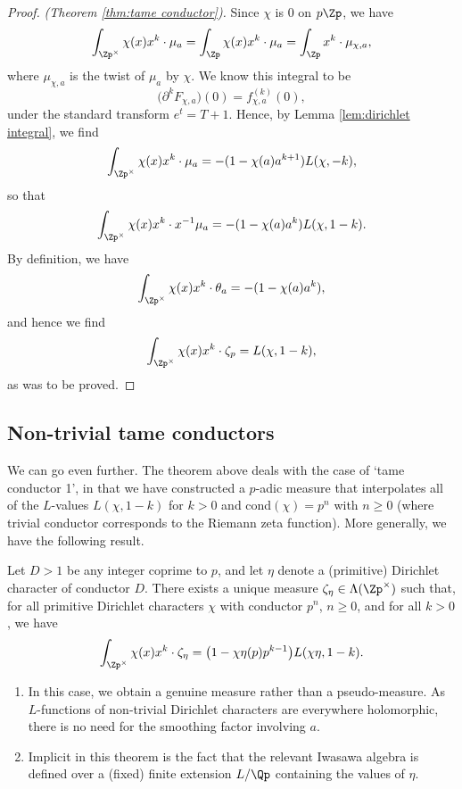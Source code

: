 \documentclass[a4paper,10pt, english, reqno]{smfart}
\numberwithin{equation}{section}
\begin{document}
\begin{proof}\emph{(Theorem \ref{thm:tame conductor}).}
Since $\chi$ is 0 on $p\Zp$, we have
\[ \int_{\Zp^\times}\chi(x)x^k \cdot\mu_a = \int_{\Zp}\chi(x)x^k \cdot\mu_a = \int_{\Zp}x^k \cdot\mu_{\chi,a}, \]
where $\mu_{\chi,a}$ is the twist of $\mu_a$ by $\chi$. We know this integral to be
\[\big( \partial^k F_{\chi,a} \big)(0) = f_{\chi,a}^{(k)}(0),\]
under the standard transform $e^t = T+1$. Hence, by Lemma \ref{lem:dirichlet integral}, we find
\[\int_{\Zp^\times}\chi(x)x^k \cdot\mu_a = -(1-\chi(a)a^{k+1})L(\chi,-k),\]
so that 
\[\int_{\Zp^\times}\chi(x)x^k \cdot x^{-1}\mu_a = -(1-\chi(a)a^{k})L(\chi,1-k).\]
By definition, we have
\[\int_{\Zp^\times}\chi(x)x^k \cdot\theta_a = -(1-\chi(a)a^{k}),\]
and hence we find
\[\int_{\Zp^\times}\chi(x)x^k \cdot\zeta_p = L(\chi,1-k),\]
as was to be proved.
\end{proof}


\subsection{Non-trivial tame conductors}\label{sec:non-trivial tame conductor}

We can go even further. The theorem above deals with the case of `tame conductor 1', in that we have constructed a $p$-adic measure that interpolates all of the $L$-values $L(\chi,1-k)$ for $k > 0$ and cond$(\chi) = p^n$ with $n \geq 0$ (where trivial conductor corresponds to the Riemann zeta function). More generally, we have the following result.

\begin{theorem} \label{thm:nontame}
Let $D > 1$ be any integer coprime to $p$, and let $\eta$ denote a (primitive) Dirichlet character of conductor $D$. There exists a unique measure $\zeta_\eta \in \Lambda(\Zp^\times)$ such that, for all primitive Dirichlet characters $\chi$ with conductor $p^n$, $n \geq 0$, and for all $k > 0$, we have
\[\int_{\Zp^\times} \chi(x) x^k \cdot\zeta_{\eta} = \big(1 - \chi \eta(p) p^{k-1}\big) L(\chi \eta,1-k). \]
\end{theorem}

\begin{remarks} \leavevmode
\begin{enumerate}
\item In this case, we obtain a genuine measure rather than a pseudo-measure. As $L$-functions of non-trivial Dirichlet characters are everywhere holomorphic, there is no need for the smoothing factor involving $a$.
\item Implicit in this theorem is the fact that the relevant Iwasawa algebra is defined over a (fixed) finite extension $L/\Qp$ containing the values of $\eta$.
\end{enumerate}
\end{remarks}
\end{document}
